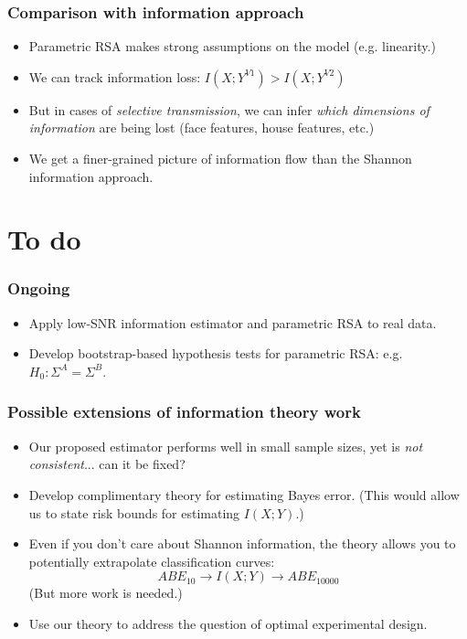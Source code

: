 \documentclass{beamer}
\begin{document}
{

}

\begin{frame}
\frametitle{Comparison with information approach}
\begin{itemize}
\item Parametric RSA makes strong assumptions on the model (e.g. linearity.)
\item We can track information loss: $I(X; Y^{V1}) > I(X; Y^{V2})$
\item But in cases of \emph{selective transmission},
we can infer \emph{which dimensions of information} are being lost
(face features, house features, etc.)
\item We get a finer-grained picture of information flow than the Shannon information approach.
\end{itemize}
\end{frame}

\section{To do}

\frame{\sectionpage}

\begin{frame}
\frametitle{Ongoing}
\begin{itemize}
\item Apply low-SNR information estimator and parametric RSA to real data.
\item Develop bootstrap-based hypothesis tests for parametric RSA: e.g. $H_0: \Sigma^A = \Sigma^B$.
\end{itemize}
\end{frame}

\begin{frame}
\frametitle{Possible extensions of information theory work}
\begin{itemize}
\item Our proposed estimator performs well in small sample sizes, yet is \emph{not consistent}... can it be fixed?
\item Develop complimentary theory for estimating Bayes error.
(This would allow us to state risk bounds for estimating $I(X; Y)$.)
\item Even if you don't care about Shannon information, the theory allows you to potentially
extrapolate classification curves:
\[
ABE_{10} \to I(X; Y) \to ABE_{10000}
\]
(But more work is needed.)
\item Use our theory to address the question of optimal experimental design.
\end{itemize}
\end{frame}
\end{document}
